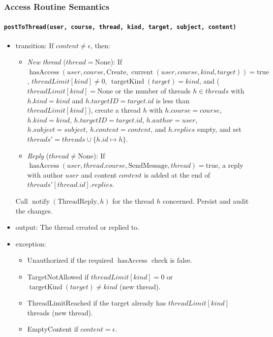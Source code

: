 \documentclass[12pt, titlepage]{article}
\begin{document}
\subsubsection{Access Routine Semantics}

\paragraph{\texttt{postToThread(user, course, thread, kind, target, subject, content)}}
\begin{itemize}
    \item transition: If $content\ne\epsilon$, then:
    \begin{itemize}
        \item \emph{New thread} ($thread=\text{None}$): If $\operatorname{hasAccess}(user,course,\text{Create},\operatorname{current}(user,course,kind,target))=\text{true}$, $\mathit{threadLimit}[kind]\ne0$, $\operatorname{targetKind}(target)=kind$, and ($\mathit{threadLimit}[kind]=\text{None}$ or the number of threads $h\in\mathit{threads}$ with $h.kind=kind$ and $h.targetID=target.id$ is less than $\mathit{threadLimit}[kind]$), create a thread $h$ with $h.course=course$, $h.kind=kind$, $h.targetID=target.id$, $h.author=user$, $h.subject=subject$, $h.content=content$, and $h.replies$ empty, and set $\mathit{threads}'=\mathit{threads}\cup\{h.id\mapsto h\}$.
        \item \emph{Reply} ($thread\ne\text{None}$): If $\operatorname{hasAccess}(user,thread.course,\text{SendMessage},thread)=\text{true}$, a reply with author $user$ and content $content$ is added at the end of $\mathit{threads}'[thread.id].replies$.
    \end{itemize}
    Call $\operatorname{notify}(\text{ThreadReply},h)$ for the thread $h$ concerned. Persist and audit the changes.
    \item output: The thread created or replied to.
    \item exception:
    \begin{itemize}
        \item Unauthorized if the required $\operatorname{hasAccess}$ check is false.
        \item TargetNotAllowed if $\mathit{threadLimit}[kind]=0$ or $\operatorname{targetKind}(target)\ne kind$ (new thread).
        \item ThreadLimitReached if the target already has $\mathit{threadLimit}[kind]$ threads (new thread).
        \item EmptyContent if $content=\epsilon$.
    \end{itemize}
\end{itemize}
\end{document}
